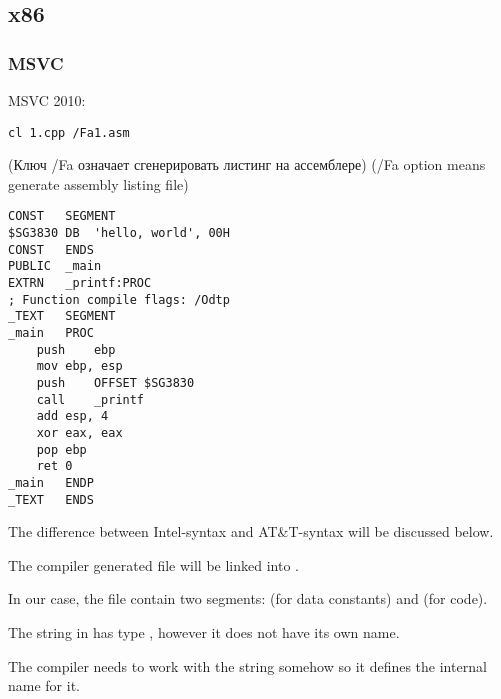 ﻿\subsection{x86}

\subsubsection{MSVC}

 MSVC 2010:

\begin{lstlisting}
cl 1.cpp /Fa1.asm
\end{lstlisting}

\IFRU
{(Ключ /Fa означает сгенерировать листинг на ассемблере)}
{(/Fa option means generate assembly listing file)}

\begin{lstlisting}[caption=MSVC 2010]
CONST	SEGMENT
$SG3830	DB	'hello, world', 00H
CONST	ENDS
PUBLIC	_main
EXTRN	_printf:PROC
; Function compile flags: /Odtp
_TEXT	SEGMENT
_main	PROC
	push	ebp
	mov	ebp, esp
	push	OFFSET $SG3830
	call	_printf
	add	esp, 4
	xor	eax, eax
	pop	ebp
	ret	0
_main	ENDP
_TEXT	ENDS
\end{lstlisting}

{The difference between Intel-syntax and AT\&T-syntax will be discussed below.}

{The compiler generated  file will be linked into .}

{In our case, the file contain two segments:  (for data constants) and  (for code).} 

{The string  in \CCpp has type , however it does not have
its own name.}

{The compiler needs to work with the string somehow so it defines the internal name  for it.}

